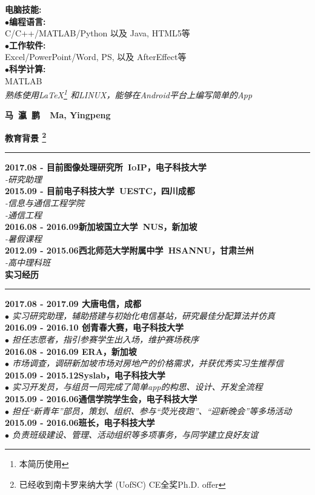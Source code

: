 \documentclass[a4paper,11pt,final]{memoir}
\newcommand{\myThemeColor}{RoyalBlue}
\newcommand{\SmallSep}{\vspace{0.9em}}
\newcommand{\CVSection}[1]
	{\Large\textbf{#1}\par
	\vspace{0.2cm}\normalsize\normalfont}
\newcommand{\CVItem}[1]
	{\textbf{\color{\myThemeColor} #1}}
\begin{document}
\begin{CJK*}{UTF8}{gbsn}
\begin{flushright}
	\CVItem{{\large 电脑技能:}}\\
	$\bullet$\textbf{编程语言:}\\ C/C++/MATLAB/Python 以及 Java, HTML5等 \\
	$\bullet$\textbf{工作软件:}\\ Excel/PowerPoint/Word, PS, 以及 AfterEffect等 \\
	$\bullet$\textbf{科学计算:}\\ MATLAB \\
	\SmallSep
	\textit{熟练使用\LaTeX \footnote{本简历使用} 和LINUX，能够在Android平台上编写简单的App}

	
\end{flushright}\normalsize
\framebreak


\Huge\bfseries {\color{\myThemeColor} 马~瀛~鹏~~Ma, Yingpeng}\\
\normalsize\normalfont

\CVSection{教育背景 \footnote{已经收到南卡罗来纳大学 (UofSC) CE全奖Ph.D. offer}}
\hrule
\SmallSep
\CVItem{2017.08 - 目前\hfill\textsc{图像处理研究所~IoIP，电子科技大学}}\\
\textit{-研究助理}
\\
\CVItem{2015.09 - 目前\hfill\textsc{电子科技大学~UESTC，四川成都}}\\
\textit{-信息与通信工程学院}\\
\textit{-通信工程}
\\
\CVItem{2016.08 - 2016.09\hfill\textsc{新加坡国立大学~NUS，新加坡}}\\
\textit{-暑假课程}
\\
\CVItem{2012.09 - 2015.06\hfill\textsc{西北师范大学附属中学~HSANNU，甘肃兰州}}\\
\textit{-高中理科班}
\\


\CVSection{实习经历}
\hrule
\SmallSep
\CVItem{2017.08 - 2017.09 \hfill 大唐电信，成都}\\
\textit{$\bullet$ 实习研究助理，辅助搭建与初始化电信基站，研究最佳分配算法并仿真}
\\
\CVItem{2016.09 - 2016.10 \hfill 创青春大赛，电子科技大学}\\
\textit{$\bullet$ 担任志愿者，指引参赛学生出入场，维护赛场秩序}
\\
\CVItem{2016.08 - 2016.09 \hfill ERA，新加坡}\\
\textit{$\bullet$ 市场调查，调研新加坡市场对房地产的价格需求，并获优秀实习生推荐信} 
\\
\CVItem{2015.09 - 2015.12\hfill Syslab，电子科技大学}\\
\textit{$\bullet$ 实习开发员，与组员一同完成了简单app的构思、设计、开发全流程}
\\
\CVItem{2015.09 - 2016.06\hfill 通信学院学生会，电子科技大学}\\
\textit{$\bullet$ 担任“新青年”部员，策划、组织、参与“荧光夜跑”、“迎新晚会”等多场活动}
\\
\CVItem{2015.09 - 2016.06\hfill 班长，电子科技大学}\\
\textit{$\bullet$ 负责班级建设、管理、活动组织等多项事务，与同学建立良好友谊}
\\


\end{CJK*}
\end{document}
